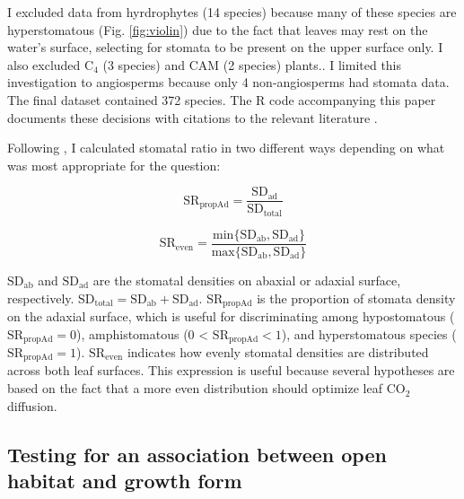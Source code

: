 \documentclass[12pt, oneside]{article}
\begin{document}
I excluded data from hyrdrophytes (14 species) because many of these species are hyperstomatous (Fig. \ref{fig:violin}) due to the fact that leaves may rest on the water's surface, selecting for stomata to be present on the upper surface only. I also excluded C$_4$ (3 species) and CAM (2 species) plants.. I limited this investigation to angiosperms because only 4 non-angiosperms had stomata data. The final dataset contained 372 species. The R code accompanying this paper documents these decisions with citations to the relevant literature \citep{Muir_dryad}.

Following \cite{Muir_2015}, I calculated stomatal ratio in two different ways depending on what was most appropriate for the question: 

\begin{equation} \label{eq:SRpropAd} 
  \mathrm{SR_{propAd}} = \frac{\mathrm{SD_{ad}}}{\mathrm{SD_{total}}}
\end{equation}

\begin{equation} \label{eq:SReven1} 
  \mathrm{SR_{even}} = \frac{\mathrm{min}\{\mathrm{SD_{ab}}, \mathrm{SD_{ad}}\}}{\mathrm{max}\{\mathrm{SD_{ab}}, \mathrm{SD_{ad}}\}}
\end{equation}

$\mathrm{SD_{ab}}$ and $\mathrm{SD_{ad}}$ are the stomatal densities on abaxial or adaxial surface, respectively. $\mathrm{SD_{total}} = \mathrm{SD_{ab}} + \mathrm{SD_{ad}}$. $\mathrm{SR_{propAd}}$ is the proportion of stomata density on the adaxial surface, which is useful for discriminating among hypostomatous ($\mathrm{SR_{propAd}} = 0$), amphistomatous (0 < $\mathrm{SR_{propAd}} < 1$), and hyperstomatous species ($\mathrm{SR_\mathrm{propAd}} = 1$). $\mathrm{SR_\mathrm{even}}$ indicates how evenly stomatal densities are distributed across both leaf surfaces. This expression is useful because several hypotheses are based on the fact that a more even distribution should optimize leaf CO$_2$ diffusion.



\subsection*{Testing for an association between open habitat and growth form}
\end{document}
